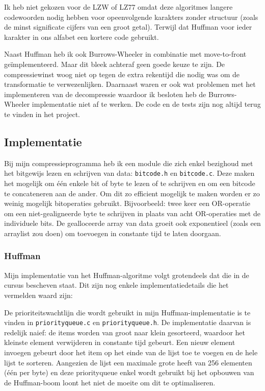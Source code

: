 \documentclass[a4paper]{article}
\begin{document}
Ik heb niet gekozen voor de LZW of LZ77 omdat deze algoritmes langere codewoorden nodig hebben voor opeenvolgende karakters zonder structuur (zoals de minst significate cijfers van een groot getal). Terwijl dat Huffman voor ieder karakter in ons alfabet een kortere code gebruikt.

Naast Huffman heb ik ook Burrows-Wheeler in combinatie met move-to-front geïmplementeerd. Maar dit bleek achteraf geen goede keuze te zijn. De compressiewinst woog niet op tegen de extra rekentijd die nodig was om de transformatie te verwezenlijken. Daarnaast waren er ook wat problemen met het implementeren van de decompressie waardoor ik besloten heb de Burrows-Wheeler implementatie niet af te werken. De code en de tests zijn nog altijd terug te vinden in het project.

\subsection{Implementatie}

Bij mijn compressieprogramma heb ik een module die zich enkel bezighoud met het bitgewijs lezen en schrijven van data: \texttt{bitcode.h} en \texttt{bitcode.c}. Deze maken het mogelijk om één enkele bit of byte te lezen of te schrijven en om een bitcode te concateneren aan de ander. Om dit zo efficient mogelijk te maken worden er zo weinig mogelijk bitoperaties gebruikt. Bijvoorbeeld: twee keer een OR-operatie om een niet-gealigneerde byte te schrijven in plaats van acht OR-operaties met de individuele bits. De gealloceerde array van data groeit ook exponentieel (zoals een arraylist zou doen) om toevoegen in constante tijd te laten doorgaan.

\subsubsection{Huffman}

Mijn implementatie van het Huffman-algoritme volgt grotendeels dat die in de cursus bescheven staat. Dit zijn nog enkele implementatiedetails die het vermelden waard zijn:

De prioriteitswachtlijn die wordt gebruikt in mijn Huffman-implementatie is te vinden in \texttt{priorityqueue.c} en \texttt{priorityqueue.h}. De implementatie daarvan is redelijk naief: de items worden van groot naar klein gesorteerd, waardoor het kleinste element verwijderen in constante tijd gebeurt. Een nieuw element invoegen gebeurt door het item op het einde van de lijst toe te voegen en de hele lijst te sorteren. Aangezien de lijst een maximale grote heeft van 256 elementen (één per byte) en deze priorityqueue enkel wordt gebruikt bij het opbouwen van de Huffman-boom loont het niet de moeite om dit te optimaliseren.
\end{document}

